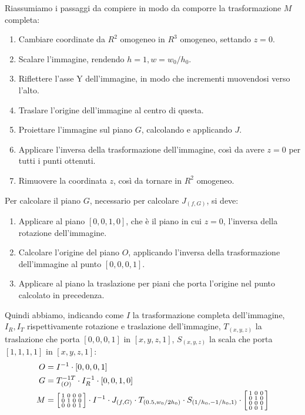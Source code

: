 Riassumiamo i passaggi da compiere in modo da comporre la trasformazione $M$ completa:
\begin{enumerate}
    \item Cambiare coordinate da $R^2$ omogeneo in $R^3$ omogeneo, settando $z=0$.
    \item Scalare l'immagine, rendendo $h = 1, w = w_0/h_0$.
    \item Riflettere l'asse Y dell'immagine, in modo che incrementi muovendosi verso l'alto.
    \item Traslare l'origine dell'immagine al centro di questa.
    \item Proiettare l'immagine sul piano $G$, calcolando e applicando $J$.
    \item Applicare l'inversa della trasformazione dell'immagine, così da avere $z=0$ per tutti i punti ottenuti.
    \item Rimuovere la coordinata $z$, così da tornare in $R^2$ omogeneo.
\end{enumerate}
Per calcolare il piano $G$, necessario per calcolare $J_{(f, G)}$, si deve:
\begin{enumerate}
    \item Applicare al piano $[0, 0, 1, 0]$, che è il piano in cui $z=0$, l'inversa della rotazione dell'immagine.
    \item Calcolare l'origine del piano $O$, applicando l'inversa della trasformazione dell'immagine al punto $[0, 0, 0, 1]$.
    \item Applicare al piano la traslazione per piani che porta l'origine nel punto calcolato in precedenza. %
\end{enumerate}
Quindi abbiamo, indicando come $I$ la trasformazione completa dell'immagine, $I_R, I_T$ rispettivamente rotazione e traslazione dell'immagine, $T_{(x, y, z)}$ la traslazione che porta $[0, 0, 0, 1]$ in $[x, y, z, 1]$, $S_{(x, y, z)}$ la scala che porta $[1, 1, 1, 1]$ in $[x, y, z, 1]$:
\begin{equation}
    \begin{aligned}
        O & = I^{-1} \cdot [0, 0, 0, 1]                       \\
        G & = T_{(O)}^{-1T} \cdot I_R^{-1} \cdot [0, 0, 1, 0] \\
        M & =
        \begin{bsmallmatrix}
            1 & 0 & 0 & 0 \\
            0 & 1 & 0 & 0 \\
            0 & 0 & 0 & 1 \\
        \end{bsmallmatrix}
        \cdot I^{-1} \cdot J_{(f, G)} \cdot T_{(0.5, w_0/2h_0)} \cdot S_{(1/h_0, -1/h_0, 1)} \cdot
        \begin{bsmallmatrix}
            1 & 0 & 0 \\
            0 & 1 & 0 \\
            0 & 0 & 0 \\
            0 & 0 & 1 \\
        \end{bsmallmatrix}                                   \\
    \end{aligned}
\end{equation}
